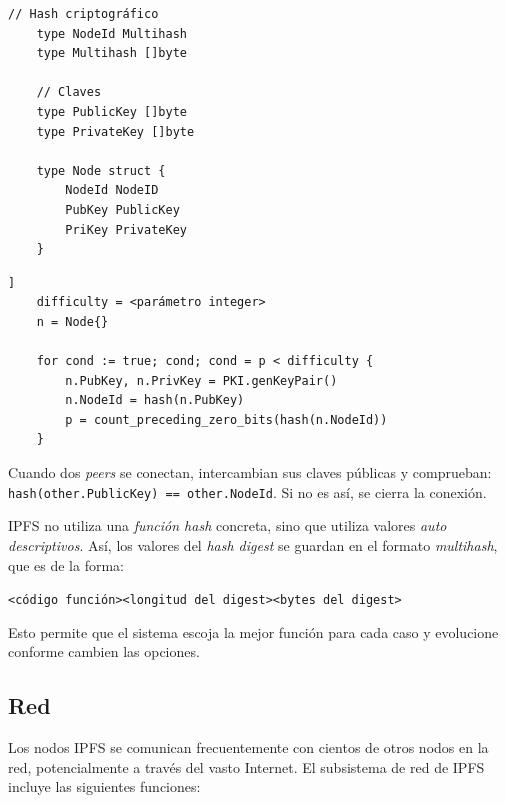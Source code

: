 \documentclass[12pt]{article} %
\begin{document}
\begin{lstlisting}[caption={Definición de Nodo.}, language=Golang]
	// Hash criptográfico
	type NodeId Multihash
	type Multihash []byte
	
	// Claves
	type PublicKey []byte
	type PrivateKey []byte

	type Node struct {
		NodeId NodeID
		PubKey PublicKey
		PriKey PrivateKey
	}
\end{lstlisting}

\begin{lstlisting}[caption={Generación de identidad con S/Kamdelia.}, language=Golang]]
	difficulty = <parámetro integer>
	n = Node{}

	for cond := true; cond; cond = p < difficulty {
		n.PubKey, n.PrivKey = PKI.genKeyPair()
		n.NodeId = hash(n.PubKey)
		p = count_preceding_zero_bits(hash(n.NodeId))
	}
\end{lstlisting}

Cuando dos \textit{peers} se conectan, intercambian sus claves públicas y comprueban: \texttt{hash(other.PublicKey) == other.NodeId}. Si no es así, se cierra la conexión.

IPFS no utiliza una \textit{función hash} concreta, sino que utiliza valores \textit{auto descriptivos}. Así, los valores del \textit{hash digest} se guardan en el formato \textit{multihash}, que es de la forma:\\ 

\centerline{\texttt{<código función><longitud del digest><bytes del digest>}} 

Esto permite que el sistema escoja la mejor función para cada caso y evolucione conforme cambien las opciones.


\subsection{Red} %
\label{sub:red}

Los nodos IPFS se comunican frecuentemente con cientos de otros nodos en la red, potencialmente a través del vasto Internet. El subsistema de red de IPFS incluye las siguientes funciones:
\end{document}
